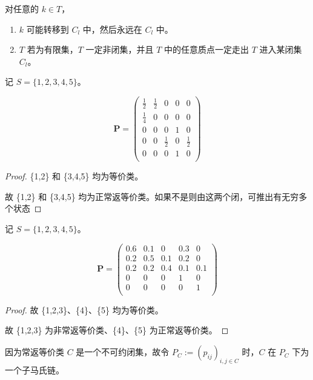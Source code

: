 \documentclass[lang=cn,10pt,thmcnt=section]{elegantbook}
\begin{document}
\begin{remark}
	对任意的 \( k \in T \)，
\begin{enumerate}
    \item \( k \) 可能转移到 \( C_l \) 中，然后永远在 \( C_l \) 中。
    \item \( T \) 若为有限集，\( T \) 一定非闭集，并且 \( T \) 中的任意质点一定走出 \( T \) 进入某闭集 \( C_l \)。
\end{enumerate}
\end{remark}
\begin{example}
	记 \( S = \{1,2,3,4,5\} \)。

\[
\mathbf{P} = \left(
\begin{array}{ccccc}
\frac{1}{2} & \frac{1}{2} & 0 & 0 & 0 \\
\frac{1}{4} & 0 & 0 & 0 & 0 \\
0 & 0 & 0 & 1 & 0 \\
0 & 0 & \frac{1}{2} & 0 & \frac{1}{2} \\
0 & 0 & 0 & 1 & 0 \\
\end{array}
\right)
\]
\end{example}
\begin{proof}
	\{1,2\} 和 \{3,4,5\} 均为等价类。

故 \{1,2\} 和 \{3,4,5\} 均为正常返等价类。如果不是则由这两个闭，可推出有无穷多个状态
\end{proof}
\begin{example}
	记 \( S = \{1,2,3,4,5\} \)。

\[
\mathbf{P} = \left(
\begin{array}{ccccc}
0.6 & 0.1 & 0 & 0.3 & 0 \\
0.2 & 0.5 & 0.1 & 0.2 & 0 \\
0.2 & 0.2 & 0.4 & 0.1 & 0.1 \\
0 & 0 & 0 & 1 & 0 \\
0 & 0 & 0 & 0 & 1 \\
\end{array}
\right)
\]
\end{example}
\begin{proof}
	故 \{1,2,3\}、\{4\}、\{5\} 均为等价类。

故 \{1,2,3\} 为非常返等价类、\{4\}、\{5\} 为正常返等价类。
\end{proof}

\begin{remark}
	因为常返等价类 \( C \) 是一个不可约闭集，故令 \( P_C := (p_{ij})_{i,j \in C} \) 时，\( C \) 在 \( P_C \) 下为一个子马氏链。
\end{remark}
\end{document}
